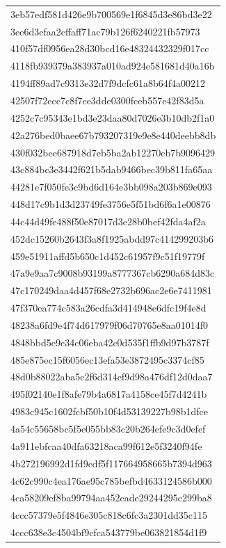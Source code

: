 \begin{tabular}{l}
3eb57edf581d426e9b700569e1f6845d3e86bd3e22 \\
3ee6d3cfaa2cffaff71ac79b126f6240221fb57973 \\
410f57df0956ea28d30bcd16e48324432329f017cc \\
4118fb939379a383937a010ad924e581681d40a16b \\
4194ff89ad7c9313e32d7f9dcfc61a8b64f4a00212 \\
42507f72ecc7c8f7ee3dde0300fceb557e42f83d5a \\
4252c7c95343e1bd3e23daa80d7026e3b10db2f1a0 \\
42a276bed0baee67b793207319e9e8e440deebb8db \\
430f032bee687918d7eb5ba2ab12270cb7b9096429 \\
43c884bc3e3442f621b5dab9466bec39b811fa65aa \\
44281e7f050fe3c9bd6d164e3bb098a203b869e093 \\
448d17c9b1d3d23749fe3756e5f51bd6f6a1e00876 \\
44c44d49fe488f50e87017d3e28b0bef42fda4af2a \\
452dc15260b2643f3a8f1925abdd97c414299203b6 \\
459e51911affd5b650c1d452c61957f9c51f19779f \\
47a9e9aa7c9008b93199a8777367cb6290a684d83c \\
47c170249daa4d457f68e2732b696ac2e6e7411981 \\
47f370ea774c583a26cdfa3d414948e6dfc19f4e8d \\
48238a6fd9e4f74d617979f06d70765e8aa01014f0 \\
4848bbd5e9c34c06eba42c0d535f1ffb9d97b3787f \\
485e875ec15f6056ec13efa53e3872495c3374cf85 \\
48d0b88022aba5c2f6d314ef9d98a476df12d0daa7 \\
495f02140e1f8afe79b4a6817a4158ce45f7d4241b \\
4983c945c1602fcbf50b10f4d53139227b98b1dfce \\
4a54c55658bc5f5e055bb83c20b264efe9c3d0efef \\
4a911ebfcaa40dfa63218aca99f612e5f3240f94fe \\
4b272196992d1fd9cdf5f117664958665b7394d963 \\
4c62c990c4ea176ae95c785befbd4633124586b000 \\
4ca58209ef8ba99794aa452cade29244295c299ba8 \\
4ccc57379e5f4846e305c818c6fc3a2301dd35c115 \\
4ccc638e3c4504bf9cfca543779be063821854d1f9 \\

\end{tabular}
